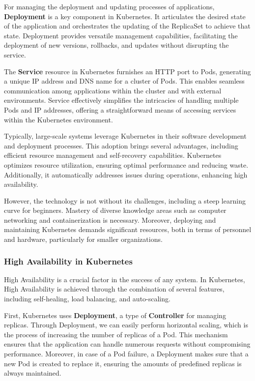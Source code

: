 For managing the deployment and updating processes of applications,
\textbf{Deployment} is a key component in Kubernetes. It articulates the desired
state of the application and orchestrates the updating of the ReplicaSet to
achieve that state. Deployment provides versatile management capabilities,
facilitating the deployment of new versions, rollbacks, and updates without
disrupting the service.

The \textbf{Service} resource in Kubernetes furnishes an HTTP port to Pods,
generating a unique IP address and DNS name for a cluster of Pods. This enables
seamless communication among applications within the cluster and with external
environments. Service effectively simplifies the intricacies of handling
multiple Pods and IP addresses, offering a straightforward means of accessing
services within the Kubernetes environment.

Typically, large-scale systems leverage Kubernetes in their software development
and deployment processes. This adoption brings several advantages, including
efficient resource management and self-recovery capabilities. Kubernetes
optimizes resource utilization, ensuring optimal performance and reducing waste.
Additionally, it automatically addresses issues during operations, enhancing
high availability.

However, the technology is not without its challenges, including a steep
learning curve for beginners. Mastery of diverse knowledge areas such as
computer networking and containerization is necessary. Moreover, deploying and
maintaining Kubernetes demands significant resources, both in terms of personnel
and hardware, particularly for smaller organizations.

\subsubsection{High Availability in Kubernetes}
High Availability is a crucial factor in the success of any system. In
Kubernetes, High Availability is achieved through the combination of several
features, including self-healing, load balancing, and auto-scaling.

First, Kubernetes uses \textbf{Deployment}, a type of \textbf{Controller} for
managing replicas. Through Deployment, we can easily perform horizontal scaling,
which is the process of increasing the number of replicas of a Pod. This
mechanism ensures that the application can handle numerous requests without
compromising performance. Moreover, in case of a Pod failure, a Deployment makes
sure that a new Pod is created to replace it, ensuring the amounts of predefined
replicas is always maintained.

